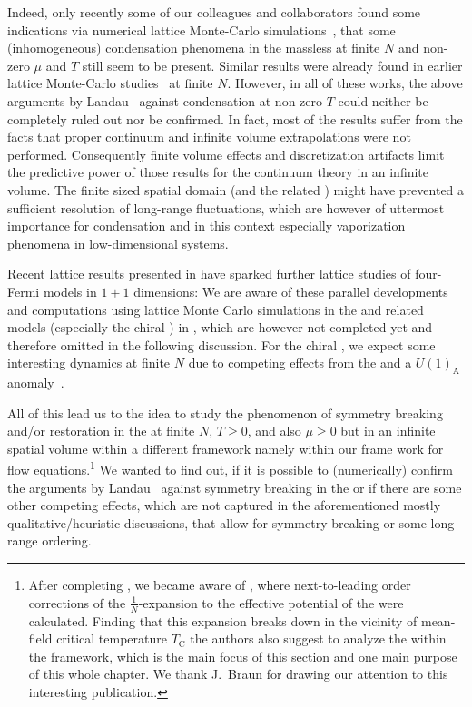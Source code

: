 Indeed, only recently some of our colleagues and collaborators found some indications via numerical lattice Monte-Carlo simulations~\cite{Pannullo:2019bfn,Pannullo:2019prx,Lenz:2020bxk,Lenz:2020cuv}, that some (inhomogeneous) condensation phenomena in the massless \bgnm{} at finite $N$ and non-zero $\mu$ and $T$ still seem to be present. Similar results were already found in earlier lattice Monte-Carlo studies~\cite{Cohen:1981qz,Cohen:1983nr,Karsch:1986hm} at finite $N$. However, in all of these works, the above arguments by Landau \etal{}\ against condensation at non-zero $T$ could neither be completely ruled out nor be confirmed. In fact, most of the results suffer from the facts that proper continuum and infinite volume extrapolations were not performed. Consequently finite volume effects and discretization artifacts limit the predictive power of those results for the continuum theory in an infinite volume. The finite sized spatial domain (and the related \bcs{}) might have prevented a sufficient resolution of long-range fluctuations, which are however of uttermost importance for condensation and in this context especially vaporization phenomena in low-dimensional systems.

Recent lattice results presented in  have sparked further lattice studies of four-Fermi models in $1 + 1$ dimensions: We are aware of these parallel developments and computations using lattice Monte Carlo simulations in the \gnm{} and related models (especially the chiral \gnm{}) in , which are however not completed yet and therefore omitted in the following discussion. For the chiral \gnm{}, we expect some interesting dynamics at finite $N$ due to competing effects from the \cmwhTheorem{} and a $U ( 1 )_\mathrm{A}$ anomaly~\cite{Furuya:1982fh}.\bigskip

All of this lead us to the idea to study the phenomenon of \ZII{} symmetry breaking and/or restoration in the \gnm{} at finite $N$, $T\geq0$, and also $\mu\geq0$ but in an infinite spatial volume within a different framework \dash{} namely within our \cfd{} frame work for \frg{} flow equations.\footnote{After completing , we became aware of , where next-to-leading order corrections of the $\tfrac{1}{N}$-expansion to the effective potential of the \gnm{} were calculated. Finding that this expansion breaks down in the vicinity of mean-field critical temperature $T_\mathrm{C}$ the authors also suggest to analyze the \gnm{} within the \frg{} framework, which is the main focus of this section and one main purpose of this whole chapter. We thank J.~Braun for drawing our attention to this interesting publication.} We wanted to find out, if it is possible to (numerically) confirm the arguments by Landau \etal{}\ against symmetry breaking in the \gnm{} or if there are some other competing effects, which are not captured in the aforementioned mostly qualitative/heuristic discussions, that allow for symmetry breaking or some long-range ordering. 
	
